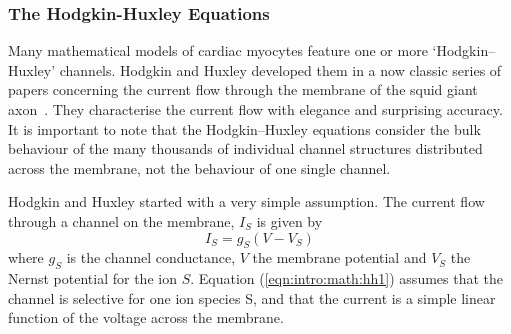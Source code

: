 \subsubsection{The Hodgkin-Huxley Equations}

Many mathematical models of cardiac myocytes feature one or more
`Hodgkin--Huxley' channels.
Hodgkin and Huxley developed them in a now classic series of papers concerning
the current flow through the membrane of the squid giant
axon~\cite{Hodgkin1952,Keener1998}.
They characterise the current flow with elegance and surprising accuracy.
It is important to note that the Hodgkin--Huxley equations consider the bulk
behaviour of the many thousands of individual channel structures distributed
across the membrane, not the behaviour of one single channel.

Hodgkin and Huxley started with a very simple assumption.
The current flow through a channel on the membrane, $I_{S}$ is given by
\begin{equation}
I_{S} = g_{S}\left(V-V_{S}\right)
\label{eqn:intro:math:hh1}
\end{equation}
where $g_{S}$ is the channel conductance, $V$ the membrane potential and $V_{S}$
the Nernst potential for the ion $S$.
Equation (\ref{eqn:intro:math:hh1}) assumes that the channel is selective for
one ion species S, and that the current is a simple linear function of the
voltage across the membrane.

